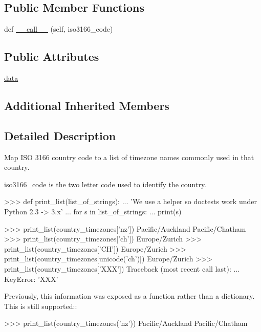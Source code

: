 \subsection*{Public Member Functions}
\begin{DoxyCompactItemize}
\item 
def \hyperlink{classpytz_1_1__CountryTimezoneDict_ad7a167f353935da067e3e0e282315023}{\+\_\+\+\_\+call\+\_\+\+\_\+} (self, iso3166\+\_\+code)
\end{DoxyCompactItemize}
\subsection*{Public Attributes}
\begin{DoxyCompactItemize}
\item 
\hyperlink{classpytz_1_1__CountryTimezoneDict_aab65f54e51e998a7d9142b38c005cf1c}{data}
\end{DoxyCompactItemize}
\subsection*{Additional Inherited Members}


\subsection{Detailed Description}
\begin{DoxyVerb}Map ISO 3166 country code to a list of timezone names commonly used
in that country.

iso3166_code is the two letter code used to identify the country.

>>> def print_list(list_of_strings):
...     'We use a helper so doctests work under Python 2.3 -> 3.x'
...     for s in list_of_strings:
...         print(s)

>>> print_list(country_timezones['nz'])
Pacific/Auckland
Pacific/Chatham
>>> print_list(country_timezones['ch'])
Europe/Zurich
>>> print_list(country_timezones['CH'])
Europe/Zurich
>>> print_list(country_timezones[unicode('ch')])
Europe/Zurich
>>> print_list(country_timezones['XXX'])
Traceback (most recent call last):
...
KeyError: 'XXX'

Previously, this information was exposed as a function rather than a
dictionary. This is still supported::

>>> print_list(country_timezones('nz'))
Pacific/Auckland
Pacific/Chatham
\end{DoxyVerb}
 

